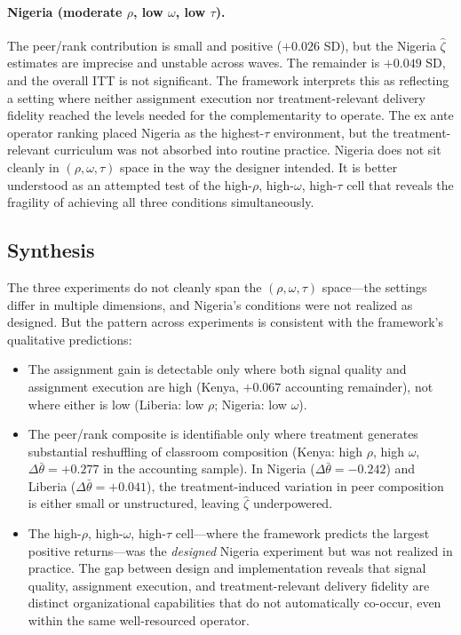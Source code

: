\documentclass[11pt]{article}
\begin{document}
\paragraph{Nigeria (moderate $\rho$, low $\omega$, low $\tau$).} The peer/rank contribution is small and positive ($+0.026$ SD), but the Nigeria $\hat{\zeta}$ estimates are imprecise and unstable across waves. The remainder is $+0.049$ SD, and the overall ITT is not significant. The framework interprets this as reflecting a setting where neither assignment execution nor treatment-relevant delivery fidelity reached the levels needed for the complementarity to operate. The ex ante operator ranking placed Nigeria as the highest-$\tau$ environment, but the treatment-relevant curriculum was not absorbed into routine practice. Nigeria does not sit cleanly in $(\rho, \omega, \tau)$ space in the way the designer intended. It is better understood as an attempted test of the high-$\rho$, high-$\omega$, high-$\tau$ cell that reveals the fragility of achieving all three conditions simultaneously.

\subsection{Synthesis}

The three experiments do not cleanly span the $(\rho, \omega, \tau)$ space---the settings differ in multiple dimensions, and Nigeria's conditions were not realized as designed. But the pattern across experiments is consistent with the framework's qualitative predictions:

\begin{itemize}
\item The assignment gain is detectable only where both signal quality and assignment execution are high (Kenya, $+0.067$ accounting remainder), not where either is low (Liberia: low $\rho$; Nigeria: low $\omega$).

\item The peer/rank composite is identifiable only where treatment generates substantial reshuffling of classroom composition (Kenya: high $\rho$, high $\omega$, $\Delta\bar{\theta} = +0.277$ in the accounting sample). In Nigeria ($\Delta\bar{\theta} = -0.242$) and Liberia ($\Delta\bar{\theta} = +0.041$), the treatment-induced variation in peer composition is either small or unstructured, leaving $\hat{\zeta}$ underpowered.

\item The high-$\rho$, high-$\omega$, high-$\tau$ cell---where the framework predicts the largest positive returns---was the \emph{designed} Nigeria experiment but was not realized in practice. The gap between design and implementation reveals that signal quality, assignment execution, and treatment-relevant delivery fidelity are distinct organizational capabilities that do not automatically co-occur, even within the same well-resourced operator.
\end{itemize}
\end{document}
